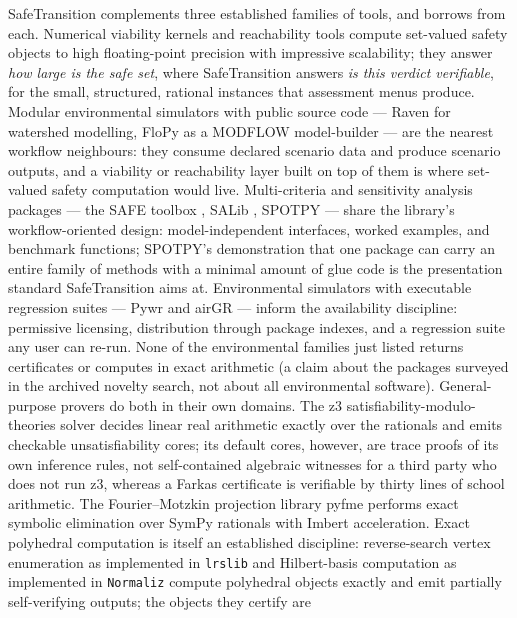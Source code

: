 \documentclass[11pt]{article}
\begin{document}
SafeTransition complements three established families of tools, and borrows
from each. Numerical viability kernels and reachability tools compute
set-valued safety objects to high floating-point precision with
impressive scalability; they answer \emph{how large is the safe set},
where SafeTransition answers \emph{is this verdict verifiable}, for the
small, structured, rational instances that assessment menus produce.
Modular environmental simulators with public source code --- Raven
\citep{Craig2020} for watershed modelling, FloPy \citep{Bakker2016} as a
MODFLOW model-builder --- are the nearest workflow neighbours: they
consume declared scenario data and produce scenario outputs, and a
viability or reachability layer built on top of them is where set-valued
safety computation would live. Multi-criteria and sensitivity
analysis packages --- the SAFE toolbox \citep{Pianosi2015}, SALib
\citep{Herman2017}, SPOTPY \citep{Houska2015} --- share the library's
workflow-oriented design: model-independent interfaces, worked examples,
and benchmark functions; SPOTPY's demonstration that one package can carry
an entire family of methods with a minimal amount of glue code is the
presentation standard SafeTransition aims at. Environmental simulators
with executable regression suites --- Pywr \citep{Tomlinson2020} and
airGR \citep{Coron2017} --- inform the availability discipline:
permissive licensing, distribution through package indexes, and a
regression suite any user can re-run. None of the environmental
families just listed returns certificates or computes in exact
arithmetic (a claim about the packages surveyed in the archived novelty
search, not about all environmental software). General-purpose
provers do both in their own domains. The z3
satisfiability-modulo-theories solver \citep{deMoura2008} decides linear
real arithmetic exactly over the rationals and emits checkable
unsatisfiability cores; its default cores, however, are trace proofs of
its own inference rules, not self-contained algebraic witnesses for a
third party who does not run z3, whereas a Farkas certificate is
verifiable by thirty lines of school arithmetic. The Fourier--Motzkin
projection library pyfme \citep{Caron2022} performs exact symbolic
elimination over SymPy rationals with Imbert acceleration. Exact
polyhedral computation is itself an established discipline:
reverse-search vertex enumeration as implemented in \texttt{lrslib}
\citep{Avis2000} and Hilbert-basis computation as implemented in
\texttt{Normaliz} \citep{Bruns2010} compute polyhedral objects exactly
and emit partially self-verifying outputs; the objects they certify are
\end{document}
